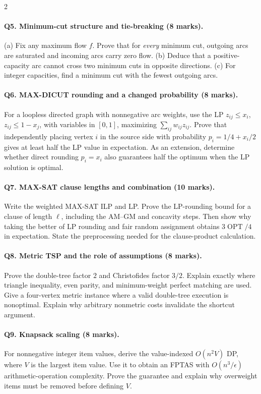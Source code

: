 \documentclass[8pt]{extarticle}
\theoremstyle{definition}
\newcommand{\OPT}{\operatorname{OPT}}
\begin{document}
\begin{multicols*}{2}
\paragraph{Q5. Minimum-cut structure and tie-breaking (8 marks).}
(a) Fix any maximum flow $f$.  Prove that for \emph{every} minimum cut,
outgoing arcs are saturated and incoming arcs carry zero flow.
(b) Deduce that a positive-capacity arc cannot cross two minimum cuts in
opposite directions.  (c) For integer capacities, find a minimum cut with
the fewest outgoing arcs.

\paragraph{Q6. MAX-DICUT rounding and a changed probability (8 marks).}
For a loopless directed graph with nonnegative arc weights, use the LP
$z_{ij}\le x_i$, $z_{ij}\le1-x_j$, with variables in $[0,1]$, maximizing
$\sum_{ij}w_{ij}z_{ij}$.  Prove that independently placing vertex $i$ in
the source side with probability $p_i=1/4+x_i/2$ gives at least half the
LP value in expectation.  As an extension, determine whether direct
rounding $p_i=x_i$ also guarantees half the optimum when the LP solution
is optimal.

\paragraph{Q7. MAX-SAT clause lengths and combination (10 marks).}
Write the weighted MAX-SAT ILP and LP.  Prove the LP-rounding bound for a
clause of length $\ell$, including the AM--GM and concavity steps.  Then
show why taking the better of LP rounding and fair random assignment
obtains $3\OPT/4$ in expectation.  State the preprocessing needed for
the clause-product calculation.

\paragraph{Q8. Metric TSP and the role of assumptions (8 marks).}
Prove the double-tree factor $2$ and Christofides factor $3/2$.  Explain
exactly where triangle inequality, even parity, and minimum-weight perfect
matching are used.  Give a four-vertex metric instance where a valid
double-tree execution is nonoptimal.  Explain why arbitrary nonmetric
costs invalidate the shortcut argument.

\paragraph{Q9. Knapsack scaling (8 marks).}
For nonnegative integer item values, derive the value-indexed $O(n^2V)$ DP,
where $V$ is the largest item value.  Use it to obtain an FPTAS with
$O(n^3/\epsilon)$ arithmetic-operation complexity.  Prove the guarantee
and explain why overweight items must be removed before defining $V$.


\end{multicols*}
\end{document}
